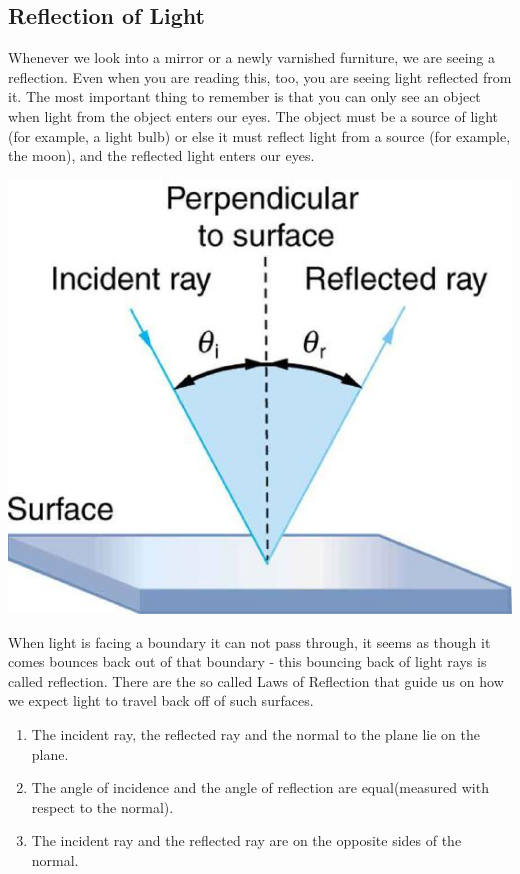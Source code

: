 \documentclass[11pt]{article}
\begin{document}
	\subsection*{Reflection of Light}
	Whenever we look into a mirror or a newly varnished furniture, we are seeing a reflection. Even when you are reading this, too, you are seeing light reflected from it. The most important thing to remember is that you can only see an object when light from the object enters our eyes. The object must be a source of light (for example, a light bulb) or else it must reflect light from a source
	(for example, the moon), and the reflected light enters our eyes.
	\begin{center}
		\includegraphics[scale=0.3]{reflection}
	\end{center}
	When light is facing a boundary it can not pass through, it seems as though it comes bounces back out of that boundary - this bouncing back of light rays is called reflection. There are the so called Laws of Reflection that guide us on how we expect light to travel back off of such surfaces.
	\begin{enumerate}
		\item The incident ray, the reflected ray and the normal to the plane lie on the plane.
		\item The angle of incidence and the angle of reflection are equal(measured with respect to the normal).
		\item The incident ray and the reflected ray are on the opposite sides of the normal.
	\end{enumerate}
\end{document}
